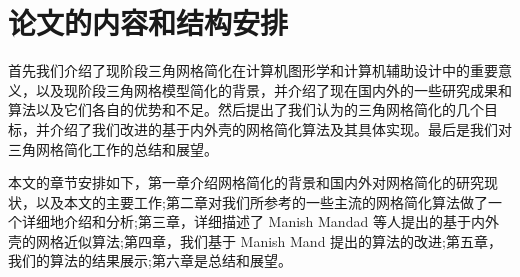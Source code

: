 

\section{论文的内容和结构安排}
首先我们介绍了现阶段三角网格简化在计算机图形学和计算机辅助设计中的重要意义，以及现阶段三角网格模型简化的背景，并介绍了现在国内外的一些研究成果和算法以及它们各自的优势和不足。然后提出了我们认为的三角网格简化的几个目标，并介绍了我们改进的基于内外壳的网格简化算法及其具体实现。最后是我们对三角网格简化工作的总结和展望。\par
本文的章节安排如下，第一章介绍网格简化的背景和国内外对网格简化的研究现状，以及本文的主要工作;第二章对我们所参考的一些主流的网格简化算法做了一个详细地介绍和分析;第三章，详细描述了 Manish Mandad 等人提出的基于内外壳的网格近似算法;第四章，我们基于 Manish Mand 提出的算法的改进;第五章，我们的算法的结果展示;第六章是总结和展望。
